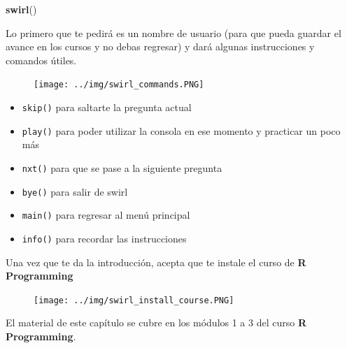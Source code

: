 \documentclass[]{article}
\newenvironment{Shaded}{\begin{snugshade}}{\end{snugshade}}
\newcommand{\KeywordTok}[1]{\textcolor[rgb]{0.13,0.29,0.53}{\textbf{#1}}}
\newcommand{\NormalTok}[1]{#1}
\providecommand{\tightlist}{%
  \setlength{\itemsep}{0pt}\setlength{\parskip}{0pt}}
\begin{document}
\begin{Shaded}
\begin{Highlighting}[]
\KeywordTok{swirl}\NormalTok{()}
\end{Highlighting}
\end{Shaded}

Lo primero que te pedirá es un nombre de usuario (para que pueda guardar
el avance en los cursos y no debas regresar) y dará algunas
instrucciones y comandos útiles.

\begin{figure}[h]
    \centering
    \texttt{[image: ../img/swirl\_commands.PNG]}
\end{figure}

\begin{itemize}
\tightlist
\item
  \texttt{skip()} para saltarte la pregunta actual
\item
  \texttt{play()} para poder utilizar la consola en ese momento y
  practicar un poco más
\item
  \texttt{nxt()} para que se pase a la siguiente pregunta
\item
  \texttt{bye()} para salir de swirl
\item
  \texttt{main()} para regresar al menú principal
\item
  \texttt{info()} para recordar las instrucciones
\end{itemize}

Una vez que te da la introducción, acepta que te instale el curso de
\textbf{R Programming}

\begin{figure}[h]
    \centering
    \texttt{[image: ../img/swirl\_install\_course.PNG]}
\end{figure}

El material de este capítulo se cubre en los módulos 1 a 3 del curso
\textbf{R Programming}.
\end{document}
